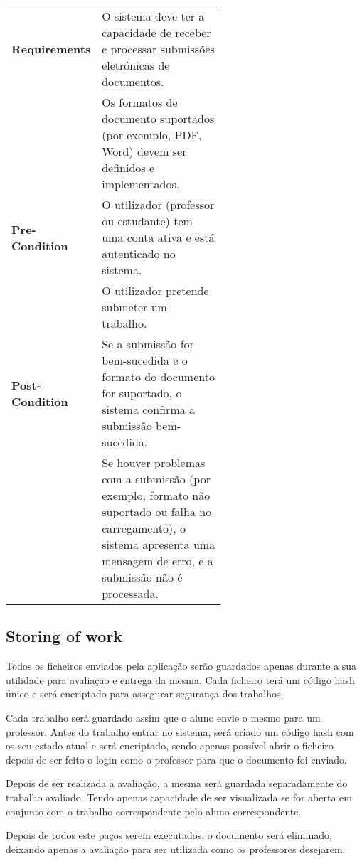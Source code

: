 \documentclass[10pt]{article}
\begin{document}
\begin{table}[H]
\begin{tabular}{|l|p{0.6\linewidth}|}
        \textbf{Requirements} & O sistema deve ter a capacidade de receber e processar submissões eletrónicas de documentos. \\
                              & Os formatos de documento suportados (por exemplo, PDF, Word) devem ser definidos e implementados. \\
                              \hline
        \textbf{Pre-Condition} & O utilizador (professor ou estudante) tem uma conta ativa e está autenticado no sistema. \\
                               & O utilizador pretende submeter um trabalho. \\
                               \hline
        \textbf{Post-Condition} & Se a submissão for bem-sucedida e o formato do documento for suportado, o sistema confirma a 
        submissão bem-sucedida. \\
                                & Se houver problemas com a submissão (por exemplo, formato não suportado ou falha no carregamento), o sistema 
                                apresenta uma mensagem de erro, e a submissão não é processada. \\
                                \hline
    \end{tabular}
\end{table}

\newpage

\subsection{Storing of work}
Todos os ficheiros enviados pela aplicação serão guardados apenas
durante a sua utilidade para avaliação e entrega da mesma.
Cada ficheiro terá um código hash único e será encriptado para assegurar
segurança dos trabalhos.

Cada trabalho será guardado assim que o aluno envie o mesmo para um professor.
Antes do trabalho entrar no sistema, será criado um código hash com os seu estado
atual e será encriptado, sendo apenas possível abrir o ficheiro depois de ser feito
o login como o professor para que o documento foi enviado.

Depois de ser realizada a avaliação, a mesma será guardada separadamente do trabalho avaliado.
Tendo apenas capacidade de ser visualizada se for aberta em conjunto com o trabalho correspondente
pelo aluno correspondente.

Depois de todos este paços serem executados, o documento será eliminado, deixando apenas a
avaliação para ser utilizada como os professores desejarem.
\end{document}
